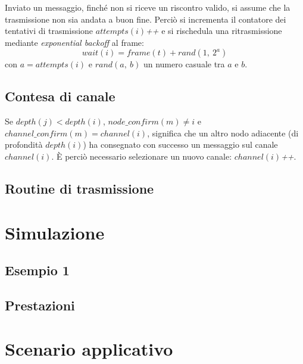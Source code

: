 \documentclass[a4paper,12pt]{article}
\theoremstyle{definition}
\begin{document}
Inviato un messaggio, finché non si riceve un riscontro valido, si assume che la trasmissione non sia andata a buon fine. Perciò si incrementa il contatore dei tentativi di trasmissione $attempts(i)$\textit{++} e si rischedula una ritrasmissione mediante \emph{exponential backoff} al frame:
\begin{displaymath}
wait(i) = frame(t) + rand(1,\ 2^a)
\end{displaymath}
con $a = attempts(i)$ e $rand(a,\ b)$ un numero casuale tra $a$ e $b$.

\subsection{Contesa di canale}

Se $depth(j) < depth(i)$, $node\_confirm(m) \neq i$ e $channel\_confirm(m) = channel(i)$, significa che un altro nodo adiacente (di profondità $depth(i)$) ha consegnato con successo un messaggio sul canale $channel(i)$. È perciò necessario selezionare un nuovo canale: $channel(i)$\textit{++}.

\subsection{Routine di trasmissione}


\section{Simulazione}


\subsection{Esempio 1}

\subsection{Prestazioni}

\section{Scenario applicativo}
\end{document}
